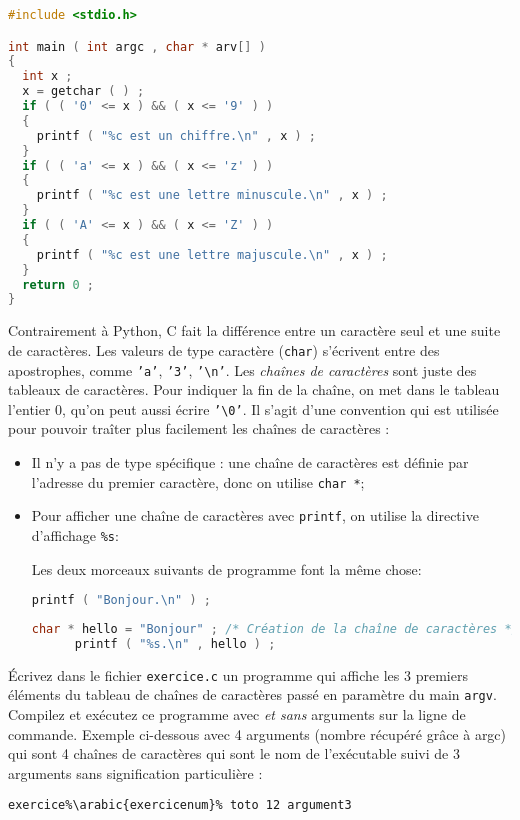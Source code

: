 \begin{solution}
  \begin{lstlisting}[language=C]
#include <stdio.h>

int main ( int argc , char * arv[] ) 
{ 
  int x ; 
  x = getchar ( ) ;
  if ( ( '0' <= x ) && ( x <= '9' ) ) 
  { 
    printf ( "%c est un chiffre.\n" , x ) ;
  } 
  if ( ( 'a' <= x ) && ( x <= 'z' ) ) 
  { 
    printf ( "%c est une lettre minuscule.\n" , x ) ;
  } 
  if ( ( 'A' <= x ) && ( x <= 'Z' ) ) 
  { 
    printf ( "%c est une lettre majuscule.\n" , x ) ;
  } 
  return 0 ; 
}
  \end{lstlisting}
\end{solution}


\prerequis {}
Contrairement à Python, C fait la différence entre un caractère seul
et une suite de caractères. Les valeurs de type caractère
(\texttt{char}) s'écrivent entre des apostrophes, comme \texttt{'a'},
\texttt{'3'}, \texttt{'\textbackslash n'}. Les \emph{chaînes de
  caractères} sont juste des tableaux de caractères. Pour indiquer la
fin de la chaîne, on met dans le tableau l'entier \(0\), qu'on peut
aussi écrire \texttt{'\textbackslash 0'}. Il s'agit d'une convention
qui est utilisée pour pouvoir traîter plus facilement les chaînes de
caractères :
\begin{itemize}
\item Il n'y a pas de type spécifique : une chaîne de caractères est
  définie par l'adresse du premier caractère, donc on utilise \texttt{char *};
\item Pour afficher une chaîne de caractères avec \texttt{printf}, on
  utilise la directive d'affichage \texttt{\%s}:
  \begin{exemple}
    Les deux morceaux suivants de programme font la même chose:
    \begin{lstlisting}[language=C]
      printf ( "Bonjour.\n" ) ;
    \end{lstlisting}
    \begin{lstlisting}[language=C]
      char * hello = "Bonjour" ; /* Création de la chaîne de caractères */
      printf ( "%s.\n" , hello ) ;
    \end{lstlisting}
  \end{exemple}
\end{itemize}

\question Écrivez dans le fichier
\texttt{exercice.c} un programme qui affiche les 3
premiers éléments du tableau de chaînes de caractères passé en paramètre du main \texttt{argv}. 
Compilez et exécutez ce programme avec \emph{et sans} arguments sur la ligne de commande.
Exemple ci-dessous avec 4 arguments (nombre récupéré grâce à argc) qui sont 
4 chaînes de caractères qui sont le nom de l'exécutable 
suivi de 3 arguments sans signification particulière :
  \begin{lstlisting}[language=bash,escapechar=\%]
  exercice%\arabic{exercicenum}% toto 12 argument3
  \end{lstlisting}

